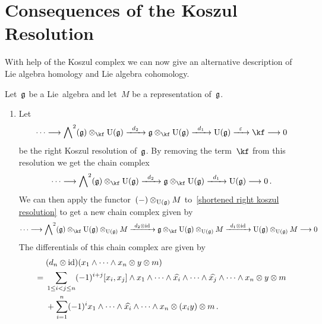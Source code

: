 \section{Consequences of the Koszul Resolution}


\begin{fluff}
	With help of the Koszul complex we can now give an alternative description of Lie algebra homology and Lie algebra cohomology.
\end{fluff}


\begin{construction}
	\label{lie algebra homology and cohomology via koszul complex}
	Let~$\mathfrak{g}$ be a Lie~algebra and let~$M$ be a representation of~$\mathfrak{g}$.
	\begin{enumerate}
		\item
			Let
			\[
				\dotsb
				\to
				\Exterior^2(\glie) \otimes_{\kf} \Univ(\glie)
				\xto{d_2}
				\glie \otimes_{\kf} \Univ(\glie)
				\xto{d_1}
				\Univ(\glie)
				\xto{\varepsilon}
				\kf
				\to
				0
			\]
			be the right Koszul resolution of~$\mathfrak{g}$.
			By removing the term~$\kf$ from this resolution we get the chain complex
			\begin{equation}
				\label{shortened right koszul resolution}
				\dotsb
				\to
				\Exterior^2(\glie) \otimes_{\kf} \Univ(\glie)
				\xto{d_2}
				\glie \otimes_{\kf} \Univ(\glie)
				\xto{d_1}
				\Univ(\glie)
				\to
				0 \,.
			\end{equation}
			We can then apply the functor~$(-) \otimes_{\operatorname{U}(\mathfrak{g})} M$ to~\eqref{shortened right koszul resolution} to get a new chain complex given by
			\[
				\dotsb
				\to
				\Exterior^2(\glie) \otimes_{\kf} \Univ(\glie) \otimes_{\Univ(\glie)} M
				\xto{\! d_2 \otimes \id \!}
				\glie \otimes_{\kf} \Univ(\glie) \otimes_{\Univ(\glie)} M
				\xto{\! d_1 \otimes \id\! }
				\Univ(\glie) \otimes_{\Univ(\glie)} M
				\to
				0
			\]
			The differentials of this chain complex are given by
			\begin{align*}
				{}&
				(d_n \otimes \mathrm{id})(x_1 \wedge \dotsb \wedge x_n \otimes y \otimes m)
				\\
				={}&
				\sum_{1 \leq i < j \leq n}
				(-1)^{i+j}
				[x_i, x_j] \wedge x_1 \wedge \dotsb \wedge \widehat{x_i} \wedge \dotsb \wedge \widehat{x_j} \wedge \dotsb \wedge x_n
				\otimes y \otimes m
				\\
				{}&
				+
				\sum_{i=1}^n
				(-1)^i
				x_1 \wedge \dotsb \wedge \widehat{x_i} \wedge \dotsb \wedge x_n \otimes (x_i y) \otimes m \,.
			\end{align*}

\end{enumerate}
\end{construction}
